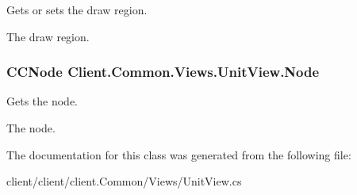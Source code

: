 Gets or sets the draw region. 

The draw region.\hypertarget{classClient_1_1Common_1_1Views_1_1UnitView_a1c4e67803cf25a3e1c6186a154249dea}{}
\subsubsection[{Node}]{\setlength{\rightskip}{0pt plus 5cm}C\+C\+Node Client.\+Common.\+Views.\+Unit\+View.\+Node\hspace{0.3cm}{\ttfamily [get]}}\label{classClient_1_1Common_1_1Views_1_1UnitView_a1c4e67803cf25a3e1c6186a154249dea}


Gets the node. 

The node.

The documentation for this class was generated from the following file\+:\begin{DoxyCompactItemize}
\item 
client/client/client.\+Common/\+Views/Unit\+View.\+cs\end{DoxyCompactItemize}
